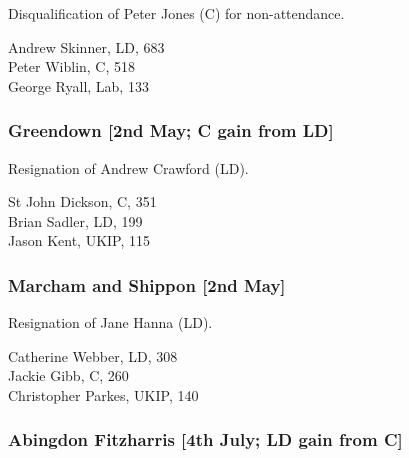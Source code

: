 \documentclass[a4paper,openany,10pt]{book}
\begin{document}
Disqualification of Peter Jones (C) for non-attendance.



Andrew Skinner, LD, 683\\
Peter Wiblin, C, 518\\
George Ryall, Lab, 133\\


\subsubsection*{Greendown \hspace*{\fill}\nolinebreak[1]%
\enspace\hspace*{\fill}
[2nd May; C gain from LD]}


Resignation of Andrew Crawford (LD).



St John Dickson, C, 351\\
Brian Sadler, LD, 199\\
Jason Kent, UKIP, 115\\


\subsubsection*{Marcham and Shippon \hspace*{\fill}\nolinebreak[1]%
\enspace\hspace*{\fill}
[2nd May]}


Resignation of Jane Hanna (LD).



Catherine Webber, LD, 308\\
Jackie Gibb, C, 260\\
Christopher Parkes, UKIP, 140\\


\subsubsection*{Abingdon Fitzharris \hspace*{\fill}\nolinebreak[1]%
\enspace\hspace*{\fill}
[4th July; LD gain from C]}

\end{document}
